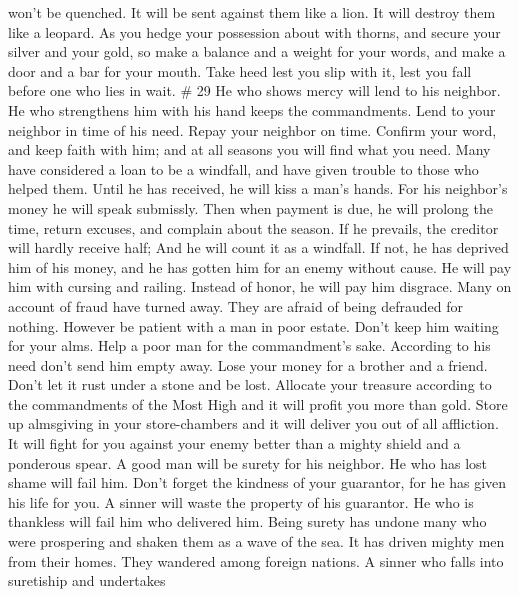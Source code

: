won't be quenched. It will be sent against them like a lion. It will
destroy them like a leopard.  As you hedge your
possession about with thorns, and secure your silver and your gold,
 so make a balance and a weight for your words, and make
a door and a bar for your mouth.  Take heed lest you slip
with it, lest you fall before one who lies in wait. \# 29 
He who shows mercy will lend to his neighbor. He who strengthens him
with his hand keeps the commandments.  Lend to your
neighbor in time of his need. Repay your neighbor on time.
 Confirm your word, and keep faith with him; and at all
seasons you will find what you need.  Many have considered
a loan to be a windfall, and have given trouble to those who helped
them.  Until he has received, he will kiss a man's hands.
For his neighbor's money he will speak submissly. Then when payment is
due, he will prolong the time, return excuses, and complain about the
season.  If he prevails, the creditor will hardly receive
half; And he will count it as a windfall. If not, he has deprived him of
his money, and he has gotten him for an enemy without cause. He will pay
him with cursing and railing. Instead of honor, he will pay him
disgrace.  Many on account of fraud have turned away. They
are afraid of being defrauded for nothing.  However be
patient with a man in poor estate. Don't keep him waiting for your alms.
 Help a poor man for the commandment's sake. According to
his need don't send him empty away.  Lose your money for
a brother and a friend. Don't let it rust under a stone and be lost.
 Allocate your treasure according to the commandments of
the Most High and it will profit you more than gold. 
Store up almsgiving in your store-chambers and it will deliver you out
of all affliction.  It will fight for you against your
enemy better than a mighty shield and a ponderous spear. 
A good man will be surety for his neighbor. He who has lost shame will
fail him.  Don't forget the kindness of your guarantor,
for he has given his life for you.  A sinner will waste
the property of his guarantor.  He who is thankless will
fail him who delivered him.  Being surety has undone many
who were prospering and shaken them as a wave of the sea. It has driven
mighty men from their homes. They wandered among foreign nations.
 A sinner who falls into suretiship and undertakes
